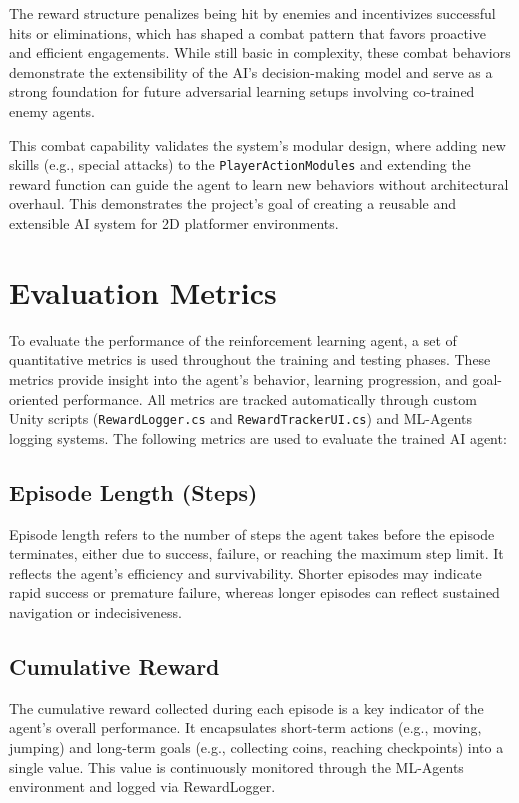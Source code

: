 \documentclass[12pt,oneside,openright,a4paper]{cpe-english-project}
\begin{document}
The reward structure penalizes being hit by enemies and incentivizes successful hits or eliminations, which has shaped a combat pattern that favors proactive and efficient engagements. While still basic in complexity, these combat behaviors demonstrate the extensibility of the AI’s decision-making model and serve as a strong foundation for future adversarial learning setups involving co-trained enemy agents.


This combat capability validates the system's modular design, where adding new skills (e.g., special attacks) to the \texttt{PlayerActionModules} and extending the reward function can guide the agent to learn new behaviors without architectural overhaul. This demonstrates the project's goal of creating a reusable and extensible AI system for 2D platformer environments.

\section{Evaluation Metrics}
To evaluate the performance of the reinforcement learning agent, a set of quantitative metrics is used throughout the training and testing phases. These metrics provide insight into the agent’s behavior, learning progression, and goal-oriented performance. All metrics are tracked automatically through custom Unity scripts (\texttt{RewardLogger.cs} and \texttt{RewardTrackerUI.cs}) and ML-Agents logging systems.
The following metrics are used to evaluate the trained AI agent:

\subsection{Episode Length (Steps)}
Episode length refers to the number of steps the agent takes before the episode terminates, either due to success, failure, or reaching the maximum step limit. It reflects the agent's efficiency and survivability. Shorter episodes may indicate rapid success or premature failure, whereas longer episodes can reflect sustained navigation or indecisiveness.

\subsection{Cumulative Reward}
The cumulative reward collected during each episode is a key indicator of the agent’s overall performance. It encapsulates short-term actions (e.g., moving, jumping) and long-term goals (e.g., collecting coins, reaching checkpoints) into a single value. This value is continuously monitored through the ML-Agents environment and logged via RewardLogger.
\end{document}
